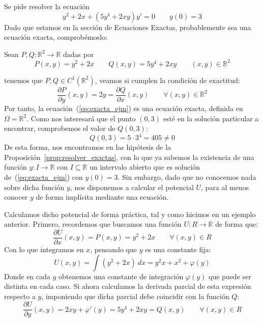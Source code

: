 
\begin{ejemplo}
    Se pide resolver la ecuación
    \begin{equation}\label{eq:exacta_ejm}
        y^2 + 2x+(5y^4 + 2xy)y' = 0 \qquad y(0) = 3
    \end{equation}
    Dado que estamos en la sección de Ecuaciones Exactas, probablemente sea una ecuación exacta, comprobémoslo:

    Sean $P,Q:\mathbb{R}^2\rightarrow\mathbb{R}$ dadas por
    \begin{equation*}
        P(x,y) = y^2 + 2x \qquad Q(x,y) = 5y^4 + 2xy \qquad (x,y)\in \mathbb{R}^2
    \end{equation*}

    tenemos que $P,Q\in C^1(\mathbb{R}^2)$, veamos si cumplen la condición de exactitud:
    \begin{equation*}
        \dfrac{\partial P}{\partial y}(x,y) = 2y = \dfrac{\partial Q}{\partial x}(x,y) \qquad \forall (x,y)\in \mathbb{R}^2
    \end{equation*}
    Por tanto, la ecuación~(\ref{eq:exacta_ejm}) es una ecuación exacta, definida en $\Omega=\mathbb{R}^2$. Como nos interesará que el punto $(0,3)$ esté en la solución particular a encontrar, comprobemos el valor de $Q(0,3)$:
    \begin{equation*}
        Q(0,3) = 5\cdot 3^4 = 405 \neq 0
    \end{equation*}
    De esta forma, nos encontramos en las hipótesis de la Proposición~\ref{prop:resolver_exactas}, con lo que ya sabemos la existencia de una función $y:I\rightarrow\mathbb{R}$ con $I\subseteq \mathbb{R}$ un intervalo abierto que es solución de~(\ref{eq:exacta_ejm}) con $y(0)=3$. Sin embargo, dado que no conocemos nada sobre dicha función $y$, nos disponemos a calcular el potencial $U$, para al menos conocer $y$ de forma implícita mediante una ecuación.

    Calculamos dicho potencial de forma práctica, tal y como hicimos en un ejemplo anterior. Primero, recordemos que buscamos una función $U:R\rightarrow\mathbb{R}$ de forma que:
    \begin{equation*}
        \dfrac{\partial U}{\partial x}(x,y) = P(x,y) =  y^2 + 2x \qquad \forall (x,y)\in R
    \end{equation*}
    Con lo que integramos en $x$, pensando que $y$ es una constante fija:
    \begin{equation*}
        U(x,y) = \int (y^2 + 2x)~dx  = y^2 x + x^2 + \varphi(y)
    \end{equation*}
    Donde en cada $y$ obtenemos una constante de integración $\varphi(y)$ que puede ser distinta en cada caso. Si ahora calculamos la derivada parcial de esta expresión respecto a $y$, imponiendo que dicha parcial debe coincidir con la función $Q$:
    \begin{equation*}
        \dfrac{\partial U}{\partial y}(x,y) = 2xy + \varphi'(y) = 5y^4 + 2xy = Q(x,y) \qquad \forall (x,y)\in R
    \end{equation*}


\end{ejemplo}
